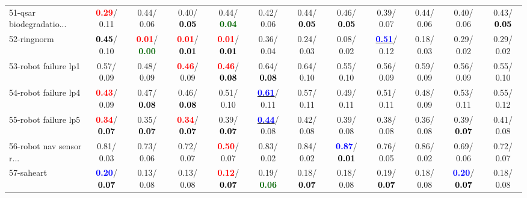 \begin{table}[h]
\begin{center}
{\begin{tabular}{lc|c|c|c|c|c|c|c|c|c|c}
51-qsar biodegradatio... & \textcolor{red}{\textbf{  0.29}}/  0.11 &   0.44/  0.06 &   0.40/\textcolor{black}{\textbf{  0.05}} &   0.44/\textcolor{darkgreen}{\textbf{  0.04}} &   0.42/  0.06 &   0.44/\textcolor{black}{\textbf{  0.05}} &   0.46/\textcolor{black}{\textbf{  0.05}} &   0.39/  0.07 &   0.44/  0.06 &   0.40/  0.06 &   0.43/\textcolor{black}{\textbf{  0.05}} \\
52-ringnorm & \textcolor{black}{\textbf{  0.45}}/  0.10 & \textcolor{red}{\textbf{  0.01}}/\textcolor{darkgreen}{\textbf{  0.00}} & \textcolor{red}{\textbf{  0.01}}/\textcolor{black}{\textbf{  0.01}} & \textcolor{red}{\textbf{  0.01}}/\textcolor{black}{\textbf{  0.01}} &   0.36/  0.04 &   0.24/  0.03 &   0.08/  0.02 & \underline{\textcolor{blue}{\textbf{  0.51}}}/  0.12 &   0.18/  0.03 &   0.29/  0.02 &   0.29/  0.02 \\
53-robot failure lp1 &   0.57/  0.09 &   0.48/  0.09 & \textcolor{red}{\textbf{  0.46}}/  0.09 & \textcolor{red}{\textbf{  0.46}}/\textcolor{black}{\textbf{  0.08}} &   0.64/\textcolor{black}{\textbf{  0.08}} &   0.64/  0.10 &   0.55/  0.10 &   0.56/  0.09 &   0.59/  0.09 &   0.56/  0.09 &   0.55/  0.10 \\ \hline
54-robot failure lp4 & \textcolor{red}{\textbf{  0.43}}/  0.09 &   0.47/\textcolor{black}{\textbf{  0.08}} &   0.46/\textcolor{black}{\textbf{  0.08}} &   0.51/  0.10 & \underline{\textcolor{blue}{\textbf{  0.61}}}/  0.11 &   0.57/  0.11 &   0.49/  0.11 &   0.51/  0.11 &   0.48/  0.09 &   0.53/  0.11 &   0.55/  0.12 \\
55-robot failure lp5 & \textcolor{red}{\textbf{  0.34}}/\textcolor{black}{\textbf{  0.07}} &   0.35/\textcolor{black}{\textbf{  0.07}} & \textcolor{red}{\textbf{  0.34}}/\textcolor{black}{\textbf{  0.07}} &   0.39/\textcolor{black}{\textbf{  0.07}} & \underline{\textcolor{blue}{\textbf{  0.44}}}/  0.08 &   0.42/  0.08 &   0.39/  0.08 &   0.38/  0.08 &   0.36/  0.08 &   0.39/\textcolor{black}{\textbf{  0.07}} &   0.41/  0.08 \\
56-robot nav sensor r... &   0.81/  0.03 &   0.73/  0.06 &   0.72/  0.07 & \textcolor{red}{\textbf{  0.50}}/  0.07 &   0.83/  0.02 &   0.84/  0.02 & \textcolor{blue}{\textbf{  0.87}}/\textcolor{black}{\textbf{  0.01}} &   0.76/  0.05 &   0.86/  0.02 &   0.69/  0.06 &   0.72/  0.07 \\
57-saheart & \textcolor{blue}{\textbf{  0.20}}/\textcolor{black}{\textbf{  0.07}} &   0.13/  0.08 &   0.13/  0.08 & \textcolor{red}{\textbf{  0.12}}/\textcolor{black}{\textbf{  0.07}} &   0.19/\textcolor{darkgreen}{\textbf{  0.06}} &   0.18/\textcolor{black}{\textbf{  0.07}} &   0.18/  0.08 &   0.19/\textcolor{black}{\textbf{  0.07}} &   0.18/  0.08 & \textcolor{blue}{\textbf{  0.20}}/\textcolor{black}{\textbf{  0.07}} &   0.18/  0.08 \\

\end{tabular}}
\end{center}
\end{table}
